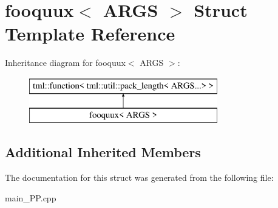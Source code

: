 \hypertarget{structfooquux}{\section{fooquux$<$ A\+R\+G\+S $>$ Struct Template Reference}
\label{structfooquux}
}
Inheritance diagram for fooquux$<$ A\+R\+G\+S $>$\+:\begin{figure}[H]
\begin{center}
\leavevmode
\includegraphics[height=2.000000cm]{structfooquux}
\end{center}
\end{figure}
\subsection*{Additional Inherited Members}


The documentation for this struct was generated from the following file\+:\begin{DoxyCompactItemize}
\item 
main\+\_\+\+P\+P.\+cpp\end{DoxyCompactItemize}
